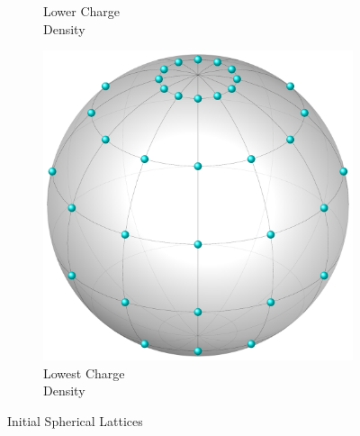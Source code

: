 \documentclass[10pt,letterpaper]{article}
\begin{document}
\begin{figure}[h!]
\begin{subfigure}[b]{0.3\textwidth}
		\caption{Lower Charge \\Density}
		\label{fig:gull}	
	\end{subfigure}
	\begin{subfigure}[b]{0.3\textwidth}
		\centering
		\includegraphics[scale=0.2]{latticeSparse.pdf}
		\caption{Lowest Charge \\Density}
		\label{fig:gull}
	\end{subfigure}
	\caption{Initial Spherical Lattices}
\end{figure}
\end{document}
